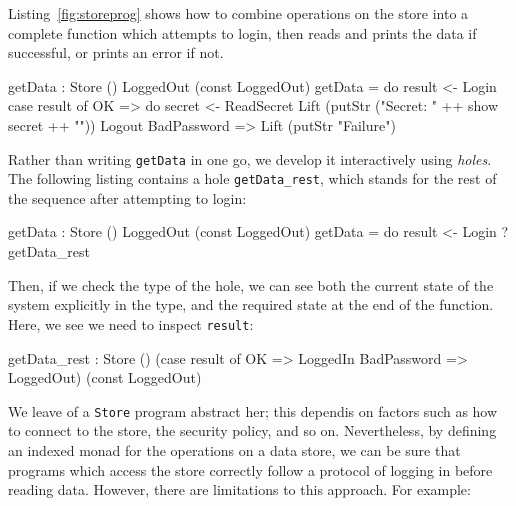 \label{sect:getdata}

Listing~\ref{fig:storeprog} shows how to combine operations on the store into a
complete function which attempts to login, then reads and prints the data if
successful, or prints an error if not.

\small
\begin{code}[float=h, frame=single,caption={A function which logs in to the
store and reads the secret data if login succeeds},label=fig:storeprog]
getData : Store () LoggedOut (const LoggedOut)
getData = do result <- Login
             case result of
                  OK => do secret <- ReadSecret
                           Lift (putStr ("Secret: " ++ show secret ++ "\n"))
                           Logout
                  BadPassword => Lift (putStr "Failure\n")
\end{code}
\normalsize

Rather than writing \texttt{getData} in one go, we develop it interactively
using \emph{holes}. The following listing contains a hole
\texttt{getData\_rest}, which stands for the rest of the sequence after
attempting to login:

\small
\begin{code}
getData : Store () LoggedOut (const LoggedOut)
getData = do result <- Login
             ?getData_rest
\end{code}
\normalsize

Then, if we check the type of the hole, we can see both the current state of
the system explicitly in the type, and the required state at the end of the
function. Here, we see we need to inspect \texttt{result}:

\small
\begin{code}
getData_rest : Store () (case result of
                              OK => LoggedIn
                              BadPassword => LoggedOut) (const LoggedOut)
\end{code}
\normalsize


We leave  of a \texttt{Store} program abstract her;
this dependis on factors such as how to connect to the store, the security
policy, and so on.
Nevertheless, by defining an indexed monad for the operations on a data store,
we can be sure that programs which access the store correctly follow a protocol
of logging in before reading data. However, there are limitations to this
approach. For example:

